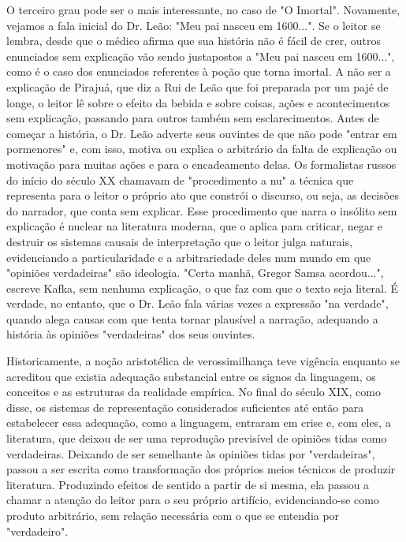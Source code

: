 O terceiro grau pode ser o mais interessante, no caso de "O Imortal".
Novamente, vejamos a fala inicial do Dr. Leão: "Meu pai nasceu em
1600...". Se o leitor se lembra, desde que o médico afirma que sua
história não é fácil de crer, outros enunciados sem explicação vão sendo
justapostos a "Meu pai nasceu em 1600...", como é o caso dos enunciados
referentes à poção que torna imortal. A não ser a explicação de Pirajuá,
que diz a Rui de Leão que foi preparada por um pajé de longe, o leitor
lê sobre o efeito da bebida e sobre coisas, ações e acontecimentos sem
explicação, passando para outros também sem esclarecimentos. Antes de
começar a história, o Dr. Leão adverte seus ouvintes de que não pode
"entrar em pormenores" e, com isso, motiva ou explica o arbitrário da
falta de explicação ou motivação para muitas ações e para o encadeamento
delas. Os formalistas russos do início do século XX chamavam de
"procedimento a nu" a técnica que representa para o leitor o próprio ato
que constrói o discurso, ou seja, as decisões do narrador, que conta sem
explicar. Esse procedimento que narra o insólito sem explicação é
nuclear na literatura moderna, que o aplica para criticar, negar e
destruir os sistemas causais de interpretação que o leitor julga
naturais, evidenciando a particularidade e a arbitrariedade deles num
mundo em que "opiniões verdadeiras" são ideologia. "Certa manhã, Gregor
Samsa acordou...", escreve Kafka, sem nenhuma explicação, o que faz com
que o texto seja literal. É verdade, no entanto, que o Dr. Leão fala
várias vezes a expressão "na verdade", quando alega causas com que tenta
tornar plausível a narração, adequando a história às opiniões
"verdadeiras" dos seus ouvintes.

Historicamente, a noção aristotélica de verossimilhança teve vigência
enquanto se acreditou que existia adequação substancial entre os signos
da linguagem, os conceitos e as estruturas da realidade empírica. No
final do século XIX, como disse, os sistemas de representação
considerados suficientes até então para estabelecer essa adequação, como
a linguagem, entraram em crise e, com eles, a literatura, que deixou de
ser uma reprodução previsível de opiniões tidas como verdadeiras.
Deixando de ser semelhante às opiniões tidas por "verdadeiras", passou a
ser escrita como transformação dos próprios meios técnicos de produzir
literatura. Produzindo efeitos de sentido a partir de si mesma, ela
passou a chamar a atenção do leitor para o seu próprio artifício,
evidenciando-se como produto arbitrário, sem relação necessária com o
que se entendia por "verdadeiro".

